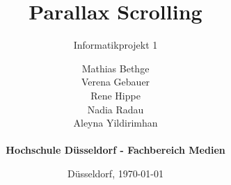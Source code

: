 \newcommand{\thesisTitle}[0]{Parallax Scrolling}
\title{\vspace{0.25\textheight}\thesisTitle}
\subtitle{Informatikprojekt 1\vspace{0.1\textheight}}
\newcommand{\thesisAuthor}[0]{Mathias Bethge, Verena Gebauer, Rene Hippe, Nadia Radau \& Aleyna Yildirimhan}
\author{%
  	{\small Mathias Bethge}
  	\\[-6pt]
 	{\small Verena Gebauer}
 	\\[-6pt]
 	{\small Rene Hippe}
 	\\[-6pt]
 	{\small Nadia Radau}
 	\\[-6pt]
  	{\small Aleyna Yildirimhan}
	\\
	\\
	{\small \textbf{Hochschule Düsseldorf - Fachbereich Medien}}
	\vspace{0.1\textheight}%
}
\date{\small{Düsseldorf, \today}}

\uppertitleback{Diese Bachelor-Thesis wurde mit Hilfe von \KOMAScript\ und \LaTeX\ erstellt.}
\lowertitleback{Copyright © by \thesisAuthor}


\maketitle[1]
